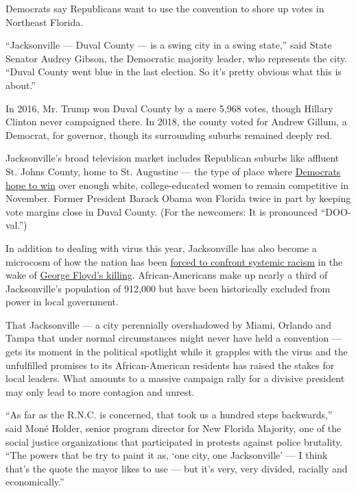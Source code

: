 Democrats say Republicans want to use the convention to shore up votes
in Northeast Florida.

``Jacksonville --- Duval County --- is a swing city in a swing state,''
said State Senator Audrey Gibson, the Democratic majority leader, who
represents the city. ``Duval County went blue in the last election. So
it's pretty obvious what this is about.''

In 2016, Mr. Trump won Duval County by a mere 5,968 votes, though
Hillary Clinton never campaigned there. In 2018, the county voted for
Andrew Gillum, a Democrat, for governor, though its surrounding suburbs
remained deeply red.

Jacksonville's broad television market includes Republican suburbs like
affluent St. Johns County, home to St. Augustine --- the type of place
where
\href{https://www.nytimes.com/2020/03/16/us/can-democrats-win-back-florida.html}{Democrats
hope to win} over enough white, college-educated women to remain
competitive in November. Former President Barack Obama won Florida twice
in part by keeping vote margins close in Duval County. (For the
newcomers: It is pronounced ``DOO-val.'')

In addition to dealing with virus this year, Jacksonville has also
become a microcosm of how the nation has been
\href{https://www.nytimes.com/2020/06/13/us/george-floyd-racism-america.html}{forced
to confront systemic racism} in the wake of
\href{https://www.nytimes.com/2020/05/29/us/derek-chauvin-george-floyd-worked-together.html}{George
Floyd's killing}. African-Americans make up nearly a third of
Jacksonville's population of 912,000 but have been historically excluded
from power in local government.

That Jacksonville --- a city perennially overshadowed by Miami, Orlando
and Tampa that under normal circumstances might never have held a
convention --- gets its moment in the political spotlight while it
grapples with the virus and the unfulfilled promises to its
African-American residents has raised the stakes for local leaders. What
amounts to a massive campaign rally for a divisive president may only
lead to more contagion and unrest.

``As far as the R.N.C. is concerned, that took us a hundred steps
backwards,'' said Moné Holder, senior program director for New Florida
Majority, one of the social justice organizations that participated in
protests against police brutality. ``The powers that be try to paint it
as, `one city, one Jacksonville' --- I think that's the quote the mayor
likes to use --- but it's very, very divided, racially and
economically.''

